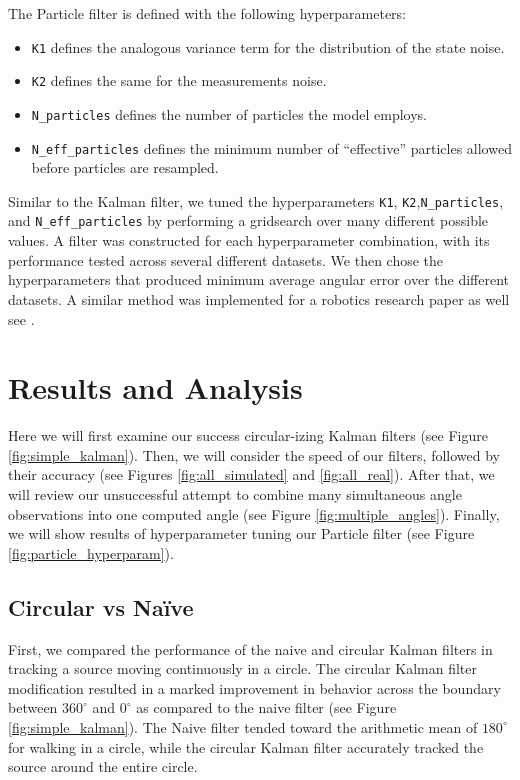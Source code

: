 \documentclass[11pt]{amsart}
\begin{document}
The Particle filter is defined with the following hyperparameters: 
\begin{itemize}
    \item \lstinline{K1} defines the analogous variance term for the distribution of the state noise.
    \item \lstinline{K2} defines the same for the measurements noise.
    \item \lstinline{N_particles} defines the number of particles the model employs.
    \item \lstinline{N_eff_particles} defines the minimum number of “effective” particles allowed before particles are resampled.
\end{itemize}

Similar to the Kalman filter, we tuned the hyperparameters \lstinline{K1},
\lstinline{K2},\newline \lstinline{N_particles}, and \lstinline{N_eff_particles} by performing a
gridsearch over many different possible values. A filter was constructed for each hyperparameter
combination, with its performance tested across several different datasets. We then chose the
hyperparameters that produced minimum average angular error over the different datasets. A similar
method was implemented for a robotics research paper as well see \cite{Oops}.

\section{Results and Analysis}
Here we will first examine our success circular-izing Kalman filters (see Figure \ref{fig:simple_kalman}). 
Then, we will consider the speed of our filters, followed by their accuracy (see Figures \ref{fig:all_simulated} and \ref{fig:all_real}).
After that, we will review our unsuccessful attempt to combine many simultaneous angle observations into one computed angle (see Figure \ref{fig:multiple_angles}).
Finally, we will show results of hyperparameter tuning our Particle filter (see Figure \ref{fig:particle_hyperparam}).

\subsection{Circular vs Naïve}
First, we compared the performance of the naive and circular Kalman filters in tracking a source moving continuously in a circle. The circular Kalman filter modification resulted in a marked improvement in behavior across the boundary between $360^{\circ}$ and $0^{\circ}$ as 
compared to the naive filter (see Figure \ref{fig:simple_kalman}). The Naive filter tended toward the arithmetic mean of $180^{\circ}$ for walking in a circle, while the circular Kalman filter accurately tracked the source around the entire circle.
\end{document}
